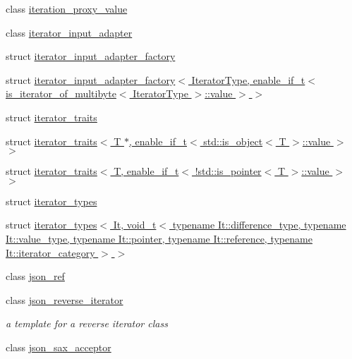\begin{DoxyCompactItemize}
class \hyperlink{classnlohmann_1_1detail_1_1iteration__proxy__value}{iteration\+\_\+proxy\+\_\+value}
\item 
class \hyperlink{classnlohmann_1_1detail_1_1iterator__input__adapter}{iterator\+\_\+input\+\_\+adapter}
\item 
struct \hyperlink{structnlohmann_1_1detail_1_1iterator__input__adapter__factory}{iterator\+\_\+input\+\_\+adapter\+\_\+factory}
\item 
struct \hyperlink{structnlohmann_1_1detail_1_1iterator__input__adapter__factory_3_01IteratorType_00_01enable__if__0e86378a778d78dd2284e92dc30f4902}{iterator\+\_\+input\+\_\+adapter\+\_\+factory$<$ Iterator\+Type, enable\+\_\+if\+\_\+t$<$ is\+\_\+iterator\+\_\+of\+\_\+multibyte$<$ Iterator\+Type $>$\+::value $>$ $>$}
\item 
struct \hyperlink{structnlohmann_1_1detail_1_1iterator__traits}{iterator\+\_\+traits}
\item 
struct \hyperlink{structnlohmann_1_1detail_1_1iterator__traits_3_01T_01_5_00_01enable__if__t_3_01std_1_1is__object_3_01T_01_4_1_1value_01_4_01_4}{iterator\+\_\+traits$<$ T $\ast$, enable\+\_\+if\+\_\+t$<$ std\+::is\+\_\+object$<$ T $>$\+::value $>$ $>$}
\item 
struct \hyperlink{structnlohmann_1_1detail_1_1iterator__traits_3_01T_00_01enable__if__t_3_01_9std_1_1is__pointer_3_01T_01_4_1_1value_01_4_01_4}{iterator\+\_\+traits$<$ T, enable\+\_\+if\+\_\+t$<$ !std\+::is\+\_\+pointer$<$ T $>$\+::value $>$ $>$}
\item 
struct \hyperlink{structnlohmann_1_1detail_1_1iterator__types}{iterator\+\_\+types}
\item 
struct \hyperlink{structnlohmann_1_1detail_1_1iterator__types_3_01It_00_01void__t_3_01typename_01It_1_1difference_d2be8685966c97e00e99d4fd2366dc0b}{iterator\+\_\+types$<$ It, void\+\_\+t$<$ typename It\+::difference\+\_\+type, typename It\+::value\+\_\+type, typename It\+::pointer, typename It\+::reference, typename It\+::iterator\+\_\+category $>$ $>$}
\item 
class \hyperlink{classnlohmann_1_1detail_1_1json__ref}{json\+\_\+ref}
\item 
class \hyperlink{classnlohmann_1_1detail_1_1json__reverse__iterator}{json\+\_\+reverse\+\_\+iterator}
\begin{DoxyCompactList}\small\item\em a template for a reverse iterator class \end{DoxyCompactList}\item 
class \hyperlink{classnlohmann_1_1detail_1_1json__sax__acceptor}{json\+\_\+sax\+\_\+acceptor}

\end{DoxyCompactItemize}

